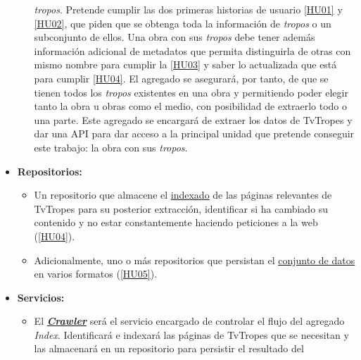 \begin{itemize}
\begin{itemize}
    \textit{tropos}. Pretende cumplir las dos primeras historias de usuario
    \href{https://github.com/jlgallego99/TropesToGo/issues/6}{[HU01]} y
    \href{https://github.com/jlgallego99/TropesToGo/issues/7}{[HU02]}, que piden
    que se obtenga toda la información de \textit{tropos} o un subconjunto de
    ellos. Una obra con sus \textit{tropos} debe tener además información
    adicional de metadatos que permita distinguirla de otras con mismo nombre
    para cumplir la
    \href{https://github.com/jlgallego99/TropesToGo/issues/8}{[HU03]} y saber lo
    actualizada que está para cumplir
    \href{https://github.com/jlgallego99/TropesToGo/issues/9}{[HU04]}. El
    agregado se asegurará, por tanto, de que se tienen todos los \textit{tropos}
    existentes en una obra y permitiendo poder elegir tanto la obra u obras como
    el medio, con posibilidad de extraerlo todo o una parte. Este agregado se
    encargará de extraer los datos de TvTropes y dar una API para dar acceso a
    la principal unidad que pretende conseguir este trabajo: la obra con sus
    \textit{tropos}.
  \end{itemize}
  \item \textbf{Repositorios:}
  \begin{itemize}
    \item Un repositorio que almacene el
    \href{https://github.com/jlgallego99/TropesToGo/blob/master/tropestogo/index/repository.go}{indexado}
    de las páginas relevantes de TvTropes para su posterior extracción,
    identificar si ha cambiado su contenido y no estar constantemente haciendo
    peticiones a la web
    (\href{https://github.com/jlgallego99/TropesToGo/issues/9}{[HU04]}).
    \item Adicionalmente, uno o más repositorios que persistan el
    \href{https://github.com/jlgallego99/TropesToGo/blob/master/tropestogo/media/repository.go}{conjunto
    de datos} en varios formatos
    (\href{https://github.com/jlgallego99/TropesToGo/issues/30}{[HU05]}).
  \end{itemize}
  \item \textbf{Servicios:}
  \begin{itemize}
    \item El
    \textbf{\href{https://github.com/jlgallego99/TropesToGo/blob/master/tropestogo/service/crawler/crawler.go}{\textit{Crawler}}}
    será el servicio encargado de controlar el flujo del agregado
    \textit{Index}. Identificará e indexará las páginas de TvTropes que se
    necesitan y las almacenará en un repositorio para persistir el resultado del

\end{itemize}
\end{itemize}

